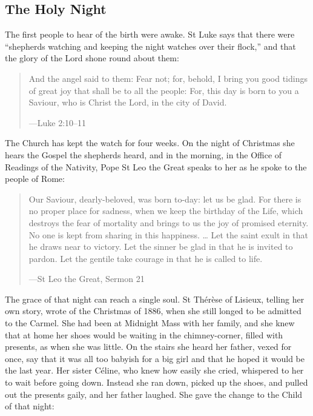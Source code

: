 \subsection{The Holy Night}\label{sec:holy-night}

The first people to hear of the birth were awake. St Luke says that there were
``shepherds watching and keeping the night watches over their flock,'' and that
the glory of the Lord shone round about them:

\begin{quote}
And the angel said to them: Fear not; for, behold, I bring you good tidings of
great joy that shall be to all the people: For, this day is born to you a
Saviour, who is Christ the Lord, in the city of David.\par
{\smallskip\noindent\small ---Luke 2:10--11\par}
\end{quote}

\noindent The Church has kept the watch for four weeks. On the night of Christmas
she hears the Gospel the shepherds heard, and in the morning, in the Office of
Readings of the Nativity, Pope St Leo the Great speaks to her as he spoke to the
people of Rome:

\begin{quote}
Our Saviour, dearly-beloved, was born to-day: let us be glad. For there is no
proper place for sadness, when we keep the birthday of the Life, which destroys
the fear of mortality and brings to us the joy of promised eternity. No one is
kept from sharing in this happiness. \ldots{} Let the saint exult in that he
draws near to victory. Let the sinner be glad in that he is invited to pardon.
Let the gentile take courage in that he is called to life.\par
{\smallskip\noindent\small ---St Leo the Great, Sermon 21\par}
\end{quote}

The grace of that night can reach a single soul. St Thérèse of Lisieux, telling
her own story, wrote of the Christmas of 1886, when she still longed to be
admitted to the Carmel. She had been at Midnight Mass with her family, and she
knew that at home her shoes would be waiting in the chimney-corner, filled with
presents, as when she was little. On the stairs she heard her father, vexed for once, say that it was
all too babyish for a big girl and that he hoped it would be the last year. Her
sister Céline, who knew how easily she cried, whispered to her to wait before
going down. Instead she ran down, picked up the shoes, and pulled out the
presents gaily, and her father laughed. She gave the change to the Child of
that night:

